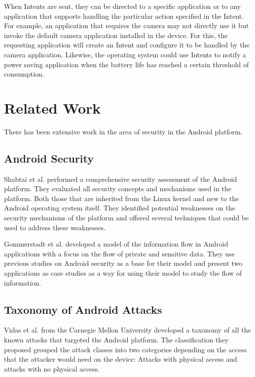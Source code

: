 \documentclass{sig-alternate}
\begin{document}
When Intents are sent, they can be directed to a specific application or to any application that supports handling the particular action specified in the Intent. For example, an application that requires the camera may not directly use it but invoke the default camera application installed in the device. For this, the requesting application will create an Intent and configure it to be handled by the camera application. Likewise, the operating system could use Intents to notify a power saving application when the battery life has reached a certain threshold of consumption.

\section{Related Work}

There has been extensive work in the area of security in the Android platform. 

\subsection{Android Security}

Shabtai et al. \cite{shabtai_google_2010} performed a comprehensive security assessment of the Android platform. They evaluated all security concepts and mechanisms used in the platform. Both those that are inherited from the Linux kernel and new to the Android operating system itself. They identified potential weaknesses on the security mechanisms of the platform and offered several techniques that could be used to address these weaknesses. 

Gommerstadt et al. \cite{gommerstadt2012android} developed a model of the information flow in Android applications with a focus on the flow of private and sensitive data. They use previous studies on Android security as a base for their model and present two applications as case studies as a way for using their model to study the flow of information.

\subsection{Taxonomy of Android Attacks}

Vidas et al. \cite{vidas_all_2011} from the Carnegie Mellon University developed a taxonomy of all the known attacks that targeted the Android platform. The classification they proposed grouped the attack classes into two categories depending on the access that the attacker would need on the device: Attacks with physical access and attacks with no physical access.
\end{document}
